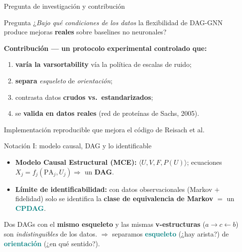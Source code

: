 \documentclass[10pt,aspectratio=169]{beamer}
\newcommand{\hl}[1]{\textcolor{teal}{\textbf{#1}}}
\begin{document}
\begin{frame}{Pregunta de investigación y contribución}
  \begin{block}{Pregunta}
  ¿\emph{Bajo qué condiciones de los datos} la flexibilidad de DAG-GNN produce
  mejoras \textbf{reales} sobre baselines no neuronales?
  \end{block}
  \textbf{Contribución --- un protocolo experimental controlado que:}
  \begin{enumerate}
    \item \textbf{varía la varsortability} vía la política de escalas de ruido;
    \item \textbf{separa} \emph{esqueleto} de \emph{orientación};
    \item contrasta datos \textbf{crudos vs.\ estandarizados};
    \item se \textbf{valida en datos reales} (red de proteínas de Sachs, 2005).
  \end{enumerate}
  \centering\footnotesize\textcolor{ink!55}{Implementación reproducible que mejora el código de Reisach et al.}
\end{frame}

\begin{frame}{Notación I: modelo causal, DAG y lo identificable}
  \begin{itemize}
    \item \textbf{Modelo Causal Estructural (MCE):} $\langle U,V,F,P(U)\rangle$;
          ecuaciones $X_j=f_j(\mathrm{PA}_j,U_j)\Rightarrow$ un \textbf{DAG}.
    \item \textbf{Límite de identificabilidad:} con datos observacionales
          (Markov $+$ fidelidad) solo se identifica la \textbf{clase de equivalencia
          de Markov} $=$ un \hl{CPDAG}.
  \end{itemize}
  \vfill
  \begin{key}
  \small Dos DAGs con el \textbf{mismo esqueleto} y las mismas \textbf{v-estructuras}
  ($a\!\to\!c\!\leftarrow\!b$) son \emph{indistinguibles} de los datos.
  $\Rightarrow$ separamos \hl{esqueleto} (¿hay arista?) de \hl{orientación} (¿en qué sentido?).
  \end{key}
\end{frame}
\end{document}
